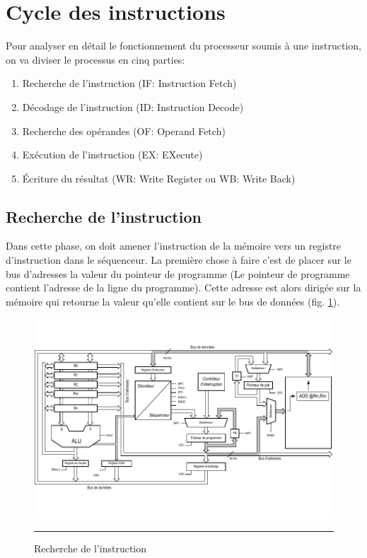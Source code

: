 \section{Cycle des instructions}
Pour analyser en détail le fonctionnement du processeur soumis à une instruction, on va diviser le processus en cinq parties:

\begin{enumerate}
\item Recherche de l'instruction (IF: Instruction Fetch)
\item Décodage de l'instruction (ID: Instruction Decode)
\item Recherche des opérandes (OF: Operand Fetch)
\item Exécution de l'instruction (EX: EXecute)
\item Écriture du résultat (WR: Write Register ou WB: Write Back)
\end{enumerate}

\newpage
\subsection{Recherche de l'instruction}
Dans cette phase, on doit amener l'instruction de la mémoire vers un registre d'instruction dans le séquenceur. La première chose à faire c'est de placer sur le bus d'adresses la valeur du pointeur de programme (Le pointeur de programme contient l'adresse de la ligne du programme). Cette adresse est alors dirigée sur la mémoire qui retourne la valeur qu'elle contient sur le bus de données (fig. \ref{fig:instr1}).

\begin{figure}[htb]
  \centering
  \includegraphics[angle=0, width=15cm, trim=0 30 0 30,clip]{./Figures/cpu/instruction1.pdf}
  \rule{35em}{0.5pt}
  \caption[instr1]{Recherche de l'instruction}
  \label{fig:instr1}
\end{figure}

